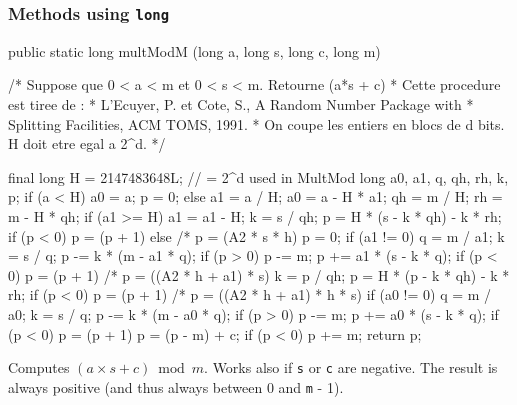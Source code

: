 \subsubsection* {Methods using \texttt{long}}
\begin{code}

   public static long multModM (long a, long s, long c, long m) \begin{hide} {

      /* Suppose que 0 < a < m  et  0 < s < m.   Retourne (a*s + c) %
       * Cette procedure est tiree de :
       * L'Ecuyer, P. et Cote, S., A Random Number Package with
       * Splitting Facilities, ACM TOMS, 1991.
       * On coupe les entiers en blocs de d bits. H doit etre egal a 2^d.  */

      final long H = 2147483648L;               // = 2^d  used in MultMod
      long a0, a1, q, qh, rh, k, p;
      if (a < H) {
         a0 = a;
         p = 0;
      } else {
         a1 = a / H;
         a0 = a - H * a1;
         qh = m / H;
         rh = m - H * qh;
         if (a1 >= H) {
            a1 = a1 - H;
            k = s / qh;
            p = H * (s - k * qh) - k * rh;
            if (p < 0)
               p = (p + 1) %
         } else                      /* p = (A2 * s * h) %
            p = 0;
         if (a1 != 0) {
            q = m / a1;
            k = s / q;
            p -= k * (m - a1 * q);
            if (p > 0)
               p -= m;
            p += a1 * (s - k * q);
            if (p < 0)
               p = (p + 1) %
         }                           /* p = ((A2 * h + a1) * s) %
         k = p / qh;
         p = H * (p - k * qh) - k * rh;
         if (p < 0)
            p = (p + 1) %
      }                               /* p = ((A2 * h + a1) * h * s) %
      if (a0 != 0) {
         q = m / a0;
         k = s / q;
         p -= k * (m - a0 * q);
         if (p > 0)
            p -= m;
         p += a0 * (s - k * q);
         if (p < 0)
            p = (p + 1) %
      }
      p = (p - m) + c;
      if (p < 0)
         p += m;
      return p;
   } \end{hide}
\end{code}
\begin{tabb} Computes $(a \times s + c) \bmod m$. Works also if \texttt{s}
  or \texttt{c} are negative.
  The result is always positive (and thus always between 0 and \texttt{m} - 1).
\end{tabb}
\begin{htmlonly}
\end{htmlonly}
